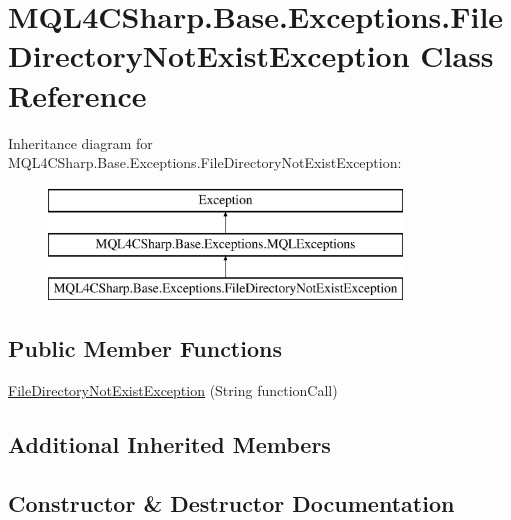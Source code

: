 \hypertarget{class_m_q_l4_c_sharp_1_1_base_1_1_exceptions_1_1_file_directory_not_exist_exception}{}\section{M\+Q\+L4\+C\+Sharp.\+Base.\+Exceptions.\+File\+Directory\+Not\+Exist\+Exception Class Reference}
\label{class_m_q_l4_c_sharp_1_1_base_1_1_exceptions_1_1_file_directory_not_exist_exception}
Inheritance diagram for M\+Q\+L4\+C\+Sharp.\+Base.\+Exceptions.\+File\+Directory\+Not\+Exist\+Exception\+:\begin{figure}[H]
\begin{center}
\leavevmode
\includegraphics[height=3.000000cm]{class_m_q_l4_c_sharp_1_1_base_1_1_exceptions_1_1_file_directory_not_exist_exception}
\end{center}
\end{figure}
\subsection*{Public Member Functions}
\begin{DoxyCompactItemize}
\item 
\hyperlink{class_m_q_l4_c_sharp_1_1_base_1_1_exceptions_1_1_file_directory_not_exist_exception_a1499760120e5812e4dae21cd1f3afba4}{File\+Directory\+Not\+Exist\+Exception} (String function\+Call)
\end{DoxyCompactItemize}
\subsection*{Additional Inherited Members}


\subsection{Constructor \& Destructor Documentation}
